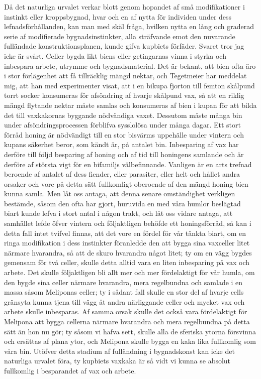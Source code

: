 Då det naturliga urvalet verkar blott genom hopandet af små modifikationer i instinkt eller kroppsbygnad, hvar och en af nytta för individen under dess lefnadsförhållanden, kan man med skäl fråga, hvilken nytta en lång och graderad serie af modifierade bygnadsinstinkter, alla sträfvande emot den nuvarande fulländade konstruktionsplanen, kunde gifva kupbiets förfäder. Svaret tror jag icke är svårt. Celler bygda likt biens eller getingarnas vinna i styrka och inbespara arbete, utrymme och bygnadsmaterial. Det är bekant, att bien ofta äro i stor förlägenhet att få tillräcklig mängd nektar, och Tegetmeier har meddelat mig, att han med experimenter visat, att i en bikupa fjorton till femton skålpund torrt socker konsumeras för afsöndring af hvarje skålpund vax, så att en riklig mängd flytande nektar måste samlas och konsumeras af bien i kupan för att bilda det till vaxkakornas byggande nödvändiga vaxet. Dessutom måste många bin under afsöndringsprocessen förblifva sysslolösa under många dagar. Ett stort förråd honing är nödvändigt till en stor bisvärms uppehälle under vintern och kupans säkerhet beror, som kändt är, på antalet bin. Inbesparing af vax har derföre till följd besparing af honing och af tid till honingens samlande och är derföre af största vigt för en bifamiljs välbefinnande. Vanligen är en arts trefnad beroende af antalet af dess fiender, eller parasiter, eller helt och hållet andra orsaker och vore på detta sätt fullkomligt oberoende af den mängd honing bien kunna samla. Men låt oss antaga, att denna senare omständighet verkligen bestämde, såsom den ofta har gjort, huruvida en med våra humlor beslägtad biart kunde lefva i stort antal i någon trakt, och låt oss vidare antaga, att samhället lefde öfver vintern och följaktligen behöfde ett honingsförråd, så kan i detta fall intet tvifvel finnas, att det vore en fördel för vår tänkta biart, om en ringa modifikation i dess instinkter föranledde den att bygga sina vaxceller litet närmare hvarandra, så att de skuro hvarandra något litet; ty om en vägg bygdes gemensam för två celler, skulle detta alltid vara en liten inbesparing på vax och arbete. Det skulle följaktligen bli allt mer och mer fördelaktigt för vår humla, om den bygde sina celler närmare hvarandra, mera regelbundna och samlade i en massa såsom Meliponas celler; ty i sådant fall skulle en stor del af hvarje cells gränsyta kunna tjena till vägg åt andra närliggande celler och mycket vax och arbete skulle inbesparas. Af samma orsak skulle det också vara fördelaktigt för Melipona att bygga cellerna närmare hvarandra och mera regelbundna på detta sätt än hon nu gör; ty såsom vi hafva sett, skulle alla de sferiska ytorna försvinna och ersättas af plana ytor, och Melipona skulle bygga en kaka lika fullkomlig som våra bin. Utöfver detta stadium af fulländning i bygnadskonst kan icke det naturliga urvalet föra, ty kupbiets vaxkaka är så vidt vi kunna se absolut fullkomlig i besparandet af vax och arbete.

